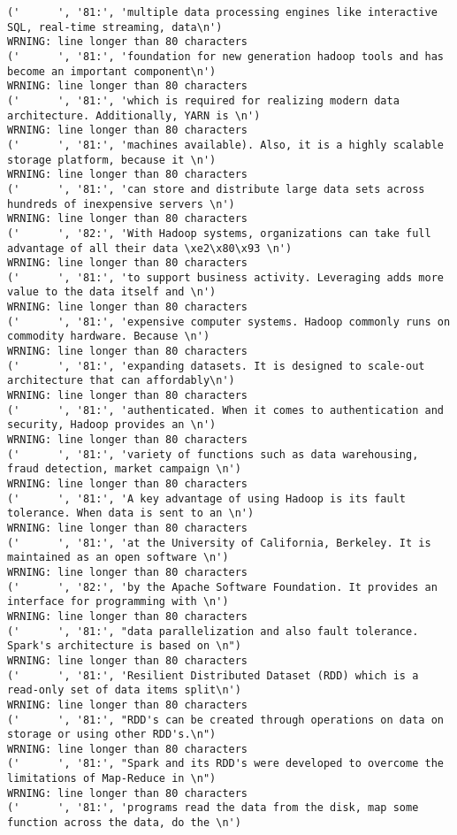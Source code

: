 \begin{tiny}
\begin{verbatim}
('      ', '81:', 'multiple data processing engines like interactive SQL, real-time streaming, data\n')
WRNING: line longer than 80 characters
('      ', '81:', 'foundation for new generation hadoop tools and has become an important component\n')
WRNING: line longer than 80 characters
('      ', '81:', 'which is required for realizing modern data architecture. Additionally, YARN is \n')
WRNING: line longer than 80 characters
('      ', '81:', 'machines available). Also, it is a highly scalable storage platform, because it \n')
WRNING: line longer than 80 characters
('      ', '81:', 'can store and distribute large data sets across hundreds of inexpensive servers \n')
WRNING: line longer than 80 characters
('      ', '82:', 'With Hadoop systems, organizations can take full advantage of all their data \xe2\x80\x93 \n')
WRNING: line longer than 80 characters
('      ', '81:', 'to support business activity. Leveraging adds more value to the data itself and \n')
WRNING: line longer than 80 characters
('      ', '81:', 'expensive computer systems. Hadoop commonly runs on commodity hardware. Because \n')
WRNING: line longer than 80 characters
('      ', '81:', 'expanding datasets. It is designed to scale-out architecture that can affordably\n')
WRNING: line longer than 80 characters
('      ', '81:', 'authenticated. When it comes to authentication and security, Hadoop provides an \n')
WRNING: line longer than 80 characters
('      ', '81:', 'variety of functions such as data warehousing, fraud detection, market campaign \n')
WRNING: line longer than 80 characters
('      ', '81:', 'A key advantage of using Hadoop is its fault tolerance. When data is sent to an \n')
WRNING: line longer than 80 characters
('      ', '81:', 'at the University of California, Berkeley. It is maintained as an open software \n')
WRNING: line longer than 80 characters
('      ', '82:', 'by the Apache Software Foundation. It provides an interface for programming with \n')
WRNING: line longer than 80 characters
('      ', '81:', "data parallelization and also fault tolerance. Spark's architecture is based on \n")
WRNING: line longer than 80 characters
('      ', '81:', 'Resilient Distributed Dataset (RDD) which is a read-only set of data items split\n')
WRNING: line longer than 80 characters
('      ', '81:', "RDD's can be created through operations on data on storage or using other RDD's.\n")
WRNING: line longer than 80 characters
('      ', '81:', "Spark and its RDD's were developed to overcome the limitations of Map-Reduce in \n")
WRNING: line longer than 80 characters
('      ', '81:', 'programs read the data from the disk, map some function across the data, do the \n')

\end{verbatim}
\end{tiny}
